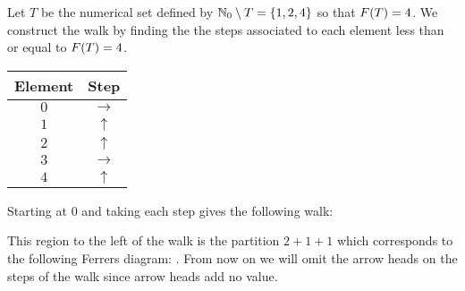 \begin{examplebox}
    Let \(T\) be the numerical set defined by \(\mathbb{N}_0 \setminus T = \{1, 2, 4\}\) so that \(F(T) = 4\). We construct the walk by finding the the steps associated to each element less than or equal to \(F(T) = 4\).

    \begin{center}
        \begin{tabular}{c|c}
        Element & Step \\
        \hline
        \(0\) & \(\rightarrow\)  \\
        \(1\) & \(\uparrow\) \\
        \(2\) & \(\uparrow\) \\
        \(3\) & \(\rightarrow\) \\
        \(4\) & \(\uparrow\) \\
        \end{tabular}
    \end{center}

    Starting at \(0\) and taking each step gives the following walk:
        \begin{center}
    \begin{center}
    \end{center}
    \end{center}

    This region to the left of the walk is the partition \(2 + 1 + 1\) which corresponds to the following Ferrers diagram: {\tiny {}}. From now on we will omit the arrow heads on the steps of the walk since arrow heads add no value.
\end{examplebox}


